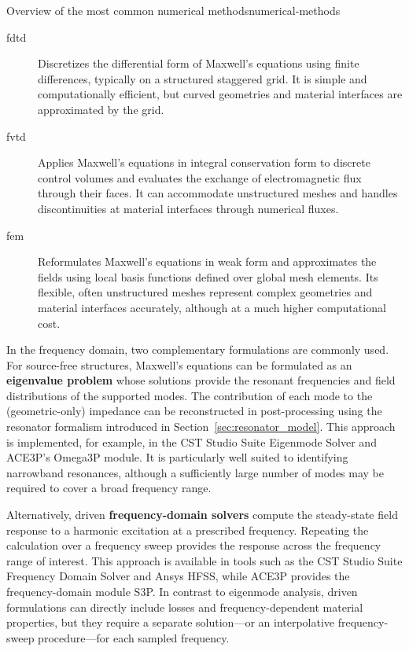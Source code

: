 \begin{definition}{Overview of the most common numerical methods}{numerical-methods}
\begin{description}
\item[\gls{fdtd}] Discretizes the differential form of Maxwell's equations using finite differences,
typically on a structured staggered grid. It is simple and computationally efficient, but curved geometries and material interfaces are approximated by the grid.

\item[\gls{fvtd}] Applies Maxwell's equations in integral conservation form to discrete control
volumes and evaluates the exchange of electromagnetic flux through their faces. It can accommodate unstructured meshes and handles discontinuities at material interfaces through numerical fluxes.

\item[\gls{fem}] Reformulates Maxwell's equations in weak form and approximates the fields using
local basis functions defined over global mesh elements. Its flexible, often unstructured meshes represent complex geometries and material interfaces accurately, although at a much higher computational cost.
\end{description}
\end{definition}

In the frequency domain, two complementary formulations are commonly used. For source-free structures, Maxwell's equations can be formulated as an \textbf{eigenvalue problem} whose solutions provide the resonant frequencies and field distributions of the supported modes. The contribution of each mode to the (geometric-only) impedance can be reconstructed in post-processing using the resonator formalism introduced in Section~\ref{sec:resonator_model}. This approach is implemented, for example, in the CST Studio Suite Eigenmode Solver and ACE3P's Omega3P\cite{candel_ace3p_2010} module. It is particularly well suited to identifying narrowband resonances, although a sufficiently large number of modes may be required to cover a broad frequency range.

Alternatively, driven \textbf{frequency-domain solvers} compute the steady-state field response to a harmonic excitation at a prescribed frequency. Repeating the calculation over a frequency sweep provides the response across the frequency range of interest. This approach is available in tools such as the CST Studio Suite Frequency Domain Solver and Ansys HFSS, while ACE3P provides the frequency-domain module S3P\cite{candel_ace3p_2010}. In contrast to eigenmode analysis, driven formulations can directly include losses and frequency-dependent material properties, but they require a separate solution---or an interpolative frequency-sweep procedure---for each sampled frequency.

